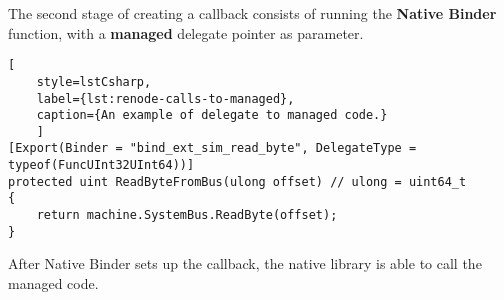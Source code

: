 \pagebreak

\noindent
The second stage of creating a callback consists of running the \textbf{Native Binder} function, with a \textbf{managed}
delegate pointer as parameter.

\begin{lstlisting}[
    style=lstCsharp,
    label={lst:renode-calls-to-managed},
    caption={An example of delegate to managed code.}
    ]
[Export(Binder = "bind_ext_sim_read_byte", DelegateType = typeof(FuncUInt32UInt64))]
protected uint ReadByteFromBus(ulong offset) // ulong = uint64_t
{
    return machine.SystemBus.ReadByte(offset);
}
\end{lstlisting}

\noindent
After Native Binder sets up the callback, the native library is able to call the managed code.